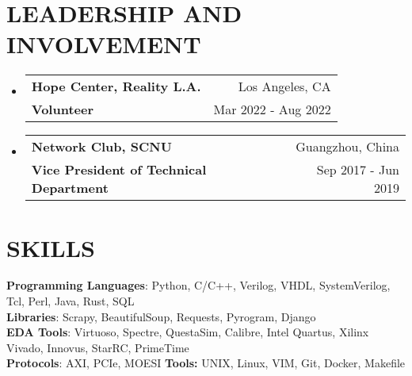 \documentclass[letterpaper,11pt]{article}
\makeatletter
\newcommand{\resumeSubheading}[4]{
  \vspace{-1pt}\item
    \begin{tabular*}{0.97\textwidth}[t]{l@{\extracolsep{\fill}}r}
      \textbf{#1} & #2 \\
      \textbf{\small#3} & \small{#4} \\
    \end{tabular*}\vspace{-10pt}
}
\newcommand{\resumeSubHeadingListStart}{\begin{itemize}[leftmargin=*]}
\newcommand{\resumeSubHeadingListEnd}{\end{itemize}\vspace{-5pt}}
\makeatother
\begin{document}
\section{LEADERSHIP AND INVOLVEMENT}
\resumeSubHeadingListStart
\resumeSubheading
    {Hope Center, Reality L.A.}{Los Angeles, CA}
    {Volunteer}{Mar 2022 - Aug 2022}
\resumeSubheading
    {Network Club, SCNU}{Guangzhou, China}
    {Vice President of Technical Department}{Sep 2017 - Jun 2019}
\resumeSubHeadingListEnd



\section{SKILLS}
\textbf{Programming Languages}: Python, C/C++, Verilog, VHDL, SystemVerilog, Tcl, Perl, Java, Rust, SQL\\ 
\textbf{Libraries}: Scrapy, BeautifulSoup, Requests, Pyrogram, Django\\ 
\textbf{EDA Tools}: Virtuoso, Spectre, QuestaSim, Calibre, Intel Quartus, Xilinx Vivado, Innovus, StarRC, PrimeTime\\ 
\textbf{Protocols}: AXI, PCIe, MOESI \hspace{\fill} \textbf{Tools:} UNIX, Linux, VIM, Git, Docker, Makefile\\ 
\end{document}
